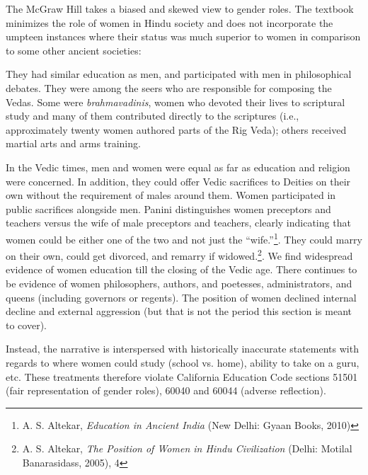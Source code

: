 The McGraw Hill takes a biased and skewed view to gender roles. The textbook minimizes the role of women in Hindu society and does not incorporate the umpteen instances where their status was much superior to women in comparison to some other ancient societies:  

They had similar education as men, and participated with men in philosophical debates. They were among the seers who are responsible for composing the Vedas. Some were \textit{brahmavadinis},  women who devoted their lives to scriptural study and many of them contributed directly to the scriptures (i.e., approximately twenty women authored parts of the Rig Veda); others received martial arts and arms training.

In the Vedic times, men and women were equal as far as education and religion were concerned. In addition, they could offer Vedic sacrifices to Deities on their own without the requirement of males around them. Women participated in public sacrifices alongside men. Panini distinguishes women preceptors and teachers versus the wife of male preceptors and teachers, clearly indicating that women could be either one of the two and not just the “wife.”\footnote{A. S. Altekar, \textit{Education in Ancient India} (New Delhi: Gyaan Books, 2010)}. They could marry on their own, could get divorced, and remarry if widowed.\footnote{A. S. Altekar, \textit{The Position of Women in Hindu Civilization} (Delhi: Motilal Banarasidass, 2005), 4}. We find widespread evidence of women education till the closing of the Vedic age. There continues to be evidence of women philosophers, authors, and poetesses, administrators, and queens (including governors or regents). The position of women declined internal decline and external aggression (but that is not the period this section is meant to cover).  

Instead, the narrative is interspersed with historically inaccurate statements with regards to where women could study (school vs. home), ability to take on a guru, etc. These treatments therefore violate California Education Code sections 51501 (fair representation of gender roles), 60040 and 60044 (adverse reflection).  

